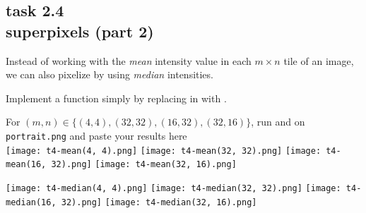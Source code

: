 
\subsection*{task 2.4 \\[1ex] superpixels (part 2)}

Instead of working with the \emph{mean} intensity value in each $m \times n$ tile of an image, we can also pixelize by using \emph{median} intensities.

Implement a function  simply by replacing  in  with .

For $(m, n) \in \bigl\{ (4,4), (32,32), (16,32), (32,16) \bigr\}$, run  and  on \texttt{portrait.png} and paste your results here \\[1cm]
\texttt{[image: t4-mean(4, 4).png]} \hfill
\texttt{[image: t4-mean(32, 32).png]} \hfill
\texttt{[image: t4-mean(16, 32).png]} \hfill
\texttt{[image: t4-mean(32, 16).png]} 

\texttt{[image: t4-median(4, 4).png]} \hfill
\texttt{[image: t4-median(32, 32).png]} \hfill
\texttt{[image: t4-median(16, 32).png]} \hfill
\texttt{[image: t4-median(32, 16).png]} 





